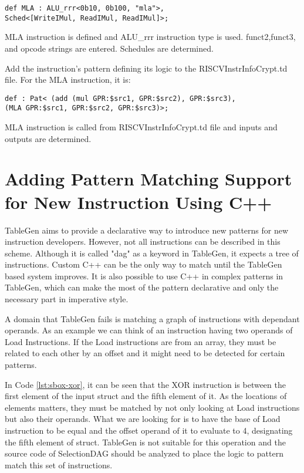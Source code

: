 \begin{lstlisting}
def MLA : ALU_rrr<0b10, 0b100, "mla">,
Sched<[WriteIMul, ReadIMul, ReadIMul]>;
\end{lstlisting}

MLA instruction is defined and ALU\_rrr instruction type is used. funct2,funct3, and opcode strings are entered. Schedules are determined.

Add the instruction’s pattern defining its logic to the RISCVInstrInfoCrypt.td file. For the MLA instruction, it is:

\begin{lstlisting}
def : Pat< (add (mul GPR:$src1, GPR:$src2), GPR:$src3),
(MLA GPR:$src1, GPR:$src2, GPR:$src3)>;
\end{lstlisting}

MLA instruction is called from RISCVInstrInfoCrypt.td file and inputs and outputs are determined.

\section{Adding Pattern Matching Support for New Instruction Using C++}
TableGen aims to provide a declarative way to introduce new patterns for new instruction developers. However, not all instructions can be described in this scheme.  Although it is called "dag" as a keyword in TableGen, it expects a tree of instructions. Custom C++ can be the only way to match until the TableGen based system improves. It is also possible to use C++ in complex patterns in TableGen, which can make the most of the pattern declarative and only the necessary part in imperative style.
\par
A domain that TableGen fails is matching a graph of instructions with dependant operands. As an example we can think of an instruction having two operands of Load Instructions. If the Load instructions are from an array, they must be related to each other by an offset and it might need to be detected for certain patterns.




In Code \ref{lst:sbox-xor}, it can be seen that the XOR instruction is between the first element of the input struct and the fifth element of it. As the locations of elements matters, they must be matched by not only looking at Load instructions but also their operands. What we are looking for is to have the base of Load instruction to be equal and the offset operand of it to evaluate to 4, designating the fifth element of struct. TableGen is not suitable for this operation and the source code of SelectionDAG should be analyzed to place the logic to pattern match this set of instructions.

